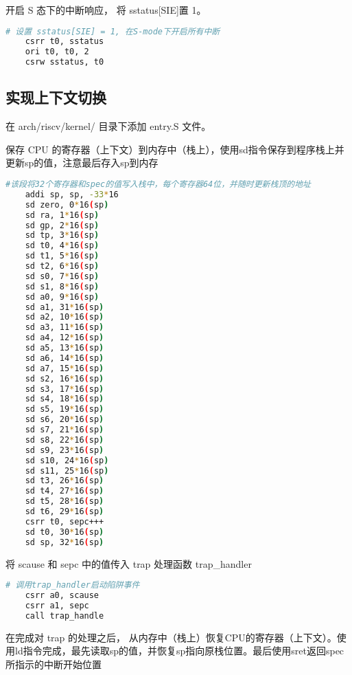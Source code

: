 \documentclass{source/Report}
\begin{document}
开启 S 态下的中断响应， 将 sstatus[SIE]置 1。

\begin{lstlisting}[language = bash, title = {开启 S 态下的中断响应}]
    # 设置 sstatus[SIE] = 1, 在S-mode下开启所有中断
    csrr t0, sstatus
    ori t0, t0, 2
    csrw sstatus, t0
\end{lstlisting}

\subsection{实现上下文切换}

在 arch/riscv/kernel/ 目录下添加 entry.S 文件。

保存 CPU 的寄存器（上下文）到内存中（栈上），使用sd指令保存到程序栈上并更新sp的值，注意最后存入sp到内存

\begin{lstlisting}[language = bash, title = {保存上下文}]
    #该段将32个寄存器和spec的值写入栈中，每个寄存器64位，并随时更新栈顶的地址
    addi sp, sp, -33*16
    sd zero, 0*16(sp)
    sd ra, 1*16(sp)
    sd gp, 2*16(sp)
    sd tp, 3*16(sp)
    sd t0, 4*16(sp)
    sd t1, 5*16(sp)
    sd t2, 6*16(sp)
    sd s0, 7*16(sp)
    sd s1, 8*16(sp)
    sd a0, 9*16(sp)
    sd a1, 31*16(sp)
    sd a2, 10*16(sp)
    sd a3, 11*16(sp)
    sd a4, 12*16(sp)
    sd a5, 13*16(sp)
    sd a6, 14*16(sp)
    sd a7, 15*16(sp)
    sd s2, 16*16(sp)
    sd s3, 17*16(sp)
    sd s4, 18*16(sp)
    sd s5, 19*16(sp)
    sd s6, 20*16(sp)
    sd s7, 21*16(sp)
    sd s8, 22*16(sp)
    sd s9, 23*16(sp)
    sd s10, 24*16(sp)
    sd s11, 25*16(sp)
    sd t3, 26*16(sp)
    sd t4, 27*16(sp)
    sd t5, 28*16(sp)
    sd t6, 29*16(sp)
    csrr t0, sepc+++
    sd t0, 30*16(sp)
    sd sp, 32*16(sp)
\end{lstlisting}

将 scause 和 sepc 中的值传入 trap 处理函数 trap\_handler

\begin{lstlisting}[language = bash, title = {scause 和 sepc 中的值传入 trap 处理函数}]
    # 调用trap_handler启动陷阱事件
    csrr a0, scause
    csrr a1, sepc
    call trap_handle
\end{lstlisting}

在完成对 trap 的处理之后， 从内存中（栈上）恢复CPU的寄存器（上下文）。使用ld指令完成，最先读取sp的值，并恢复sp指向原栈位置。最后使用sret返回spec所指示的中断开始位置
\end{document}
